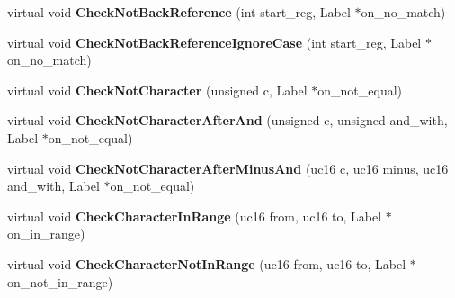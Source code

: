 \begin{DoxyCompactItemize}
\item 
\hypertarget{classv8_1_1internal_1_1_reg_exp_macro_assembler_tracer_a7abf2c26c4b7757ebad682fe31412f9c}{}virtual void {\bfseries Check\+Not\+Back\+Reference} (int start\+\_\+reg, Label $\ast$on\+\_\+no\+\_\+match)\label{classv8_1_1internal_1_1_reg_exp_macro_assembler_tracer_a7abf2c26c4b7757ebad682fe31412f9c}

\item 
\hypertarget{classv8_1_1internal_1_1_reg_exp_macro_assembler_tracer_a72ed066b7072d79949411d7bbd480617}{}virtual void {\bfseries Check\+Not\+Back\+Reference\+Ignore\+Case} (int start\+\_\+reg, Label $\ast$on\+\_\+no\+\_\+match)\label{classv8_1_1internal_1_1_reg_exp_macro_assembler_tracer_a72ed066b7072d79949411d7bbd480617}

\item 
\hypertarget{classv8_1_1internal_1_1_reg_exp_macro_assembler_tracer_ab96b6a1a33f5a61f2ab269a35a70a508}{}virtual void {\bfseries Check\+Not\+Character} (unsigned c, Label $\ast$on\+\_\+not\+\_\+equal)\label{classv8_1_1internal_1_1_reg_exp_macro_assembler_tracer_ab96b6a1a33f5a61f2ab269a35a70a508}

\item 
\hypertarget{classv8_1_1internal_1_1_reg_exp_macro_assembler_tracer_a88da33563b8ab38073a6564342db334d}{}virtual void {\bfseries Check\+Not\+Character\+After\+And} (unsigned c, unsigned and\+\_\+with, Label $\ast$on\+\_\+not\+\_\+equal)\label{classv8_1_1internal_1_1_reg_exp_macro_assembler_tracer_a88da33563b8ab38073a6564342db334d}

\item 
\hypertarget{classv8_1_1internal_1_1_reg_exp_macro_assembler_tracer_a45f1fba20ff14da621290756aff98f6c}{}virtual void {\bfseries Check\+Not\+Character\+After\+Minus\+And} (uc16 c, uc16 minus, uc16 and\+\_\+with, Label $\ast$on\+\_\+not\+\_\+equal)\label{classv8_1_1internal_1_1_reg_exp_macro_assembler_tracer_a45f1fba20ff14da621290756aff98f6c}

\item 
\hypertarget{classv8_1_1internal_1_1_reg_exp_macro_assembler_tracer_a88ae4bc8b44d8c2cf8f15efba8902a06}{}virtual void {\bfseries Check\+Character\+In\+Range} (uc16 from, uc16 to, Label $\ast$on\+\_\+in\+\_\+range)\label{classv8_1_1internal_1_1_reg_exp_macro_assembler_tracer_a88ae4bc8b44d8c2cf8f15efba8902a06}

\item 
\hypertarget{classv8_1_1internal_1_1_reg_exp_macro_assembler_tracer_a3b7297dd1fb23572b2ae82917f6b25ef}{}virtual void {\bfseries Check\+Character\+Not\+In\+Range} (uc16 from, uc16 to, Label $\ast$on\+\_\+not\+\_\+in\+\_\+range)\label{classv8_1_1internal_1_1_reg_exp_macro_assembler_tracer_a3b7297dd1fb23572b2ae82917f6b25ef}


\end{DoxyCompactItemize}
